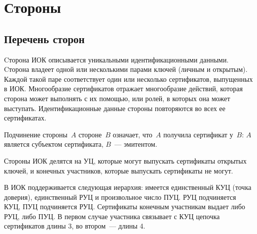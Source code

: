 \chapter{Стороны}\label{ENTITIES}

\section{Перечень сторон}

Cторона ИОК описывается уникальными идентификационными данными.
Cторона владеет одной или несколькими парами ключей (личным и 
открытым). Каждой такой паре соответствует один или несколько сертификатов, 
выпущенных в ИОК. Многообразие сертификатов отражает многообразие 
действий, которая сторона может выполнять с их помощью, или ролей, 
в которых она может выступать. Идентификационные данные стороны 
повторяются во всех ее сертификатах. 

Подчинение стороны~$A$ стороне~$B$ означает, что~$A$ получила сертификат 
у~$B$: $A$ является субъектом сертификата, $B$~--- эмитентом.

Стороны ИОК делятся на УЦ, которые могут выпускать сертификаты открытых ключей, 
и конечных участников, которые выпускать сертификаты не могут.

В ИОК поддерживается следующая иерархия: 
имеется единственный КУЦ (точка доверия), единственный РУЦ и
произвольное число ПУЦ. РУЦ подчиняется КУЦ, ПУЦ подчиняется РУЦ. 
Сертификаты конечным участникам выдает либо РУЦ, либо ПУЦ.
В первом случае участника связывает с КУЦ цепочка сертификатов длины 3,
во втором~--- длины 4.

